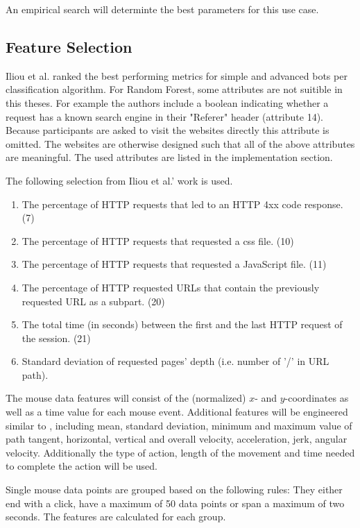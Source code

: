 \documentclass[
    fontsize=12pt,
    headings=small,
    parskip=half,           %
    bibliography=totoc,
    numbers=noenddot,       %
    open=any,               %
    final                   %
]{scrreprt}
\begin{document}
An empirical search will determinte the best parameters for this use case.

\subsection{Feature Selection}

Iliou et al. \cite{10.1145/3339252.3339267} ranked the best performing metrics for simple and advanced bots per classification algorithm. For Random Forest, some attributes are not suitible in this theses. For example the authors include a boolean indicating whether a request has a known search engine in their "Referer" header (attribute 14). Because participants are asked to visit the websites directly this attribute is omitted. The websites are otherwise designed such that all of the above attributes are meaningful. The used attributes are listed in the implementation section.

The following selection from Iliou et al.' work \cite{10.1145/3339252.3339267} is used.

\begin{enumerate}
	\item The percentage of HTTP requests that led to an HTTP 4xx code response. (7)
	\item The percentage of HTTP requests that requested a css file. (10)
	\item The percentage of HTTP requests that requested a JavaScript file. (11)
	\item The percentage of HTTP requested URLs that contain the previously requested URL as a subpart. (20)
	\item The total time (in seconds) between the first and the last HTTP request of the session. (21)
	\item Standard deviation of requested pages' depth (i.e. number of ’/’ in URL path).
\end{enumerate}

The mouse data features will consist of the (normalized) $x$- and $y$-coordinates as well as a time value for each mouse event. Additional features will be engineered similar to \cite{https://doi.org/10.1049/iet-bmt.2018.5126}, including mean, standard deviation, minimum and maximum value of path tangent, horizontal, vertical and overall velocity, acceleration, jerk, angular velocity. Additionally the type of action, length of the movement and time needed to complete the action will be used.

Single mouse data points are grouped based on the following rules: They either end with a click, have a maximum of 50 data points or span a maximum of two seconds. The features are calculated for each group.
\end{document}
